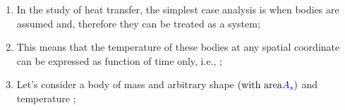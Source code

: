 \documentclass[10pt,compress,unknownkeysallowed]{beamer}
\begin{document}
\begin{frame}
%
        \begin{enumerate}
           \item<1-> In the study of heat transfer, the simplest case analysis is when bodies are assumed  and, therefore they can be treated as a  system;
           \item<2-> This means that the temperature of these bodies at any spatial coordinate can be expressed as function of time only, i.e., ; 
           \item<4-> Let's consider a body of mass  and arbitrary shape $\left(\text{with area} \textcolor{blue}{A_{s}}\right)$ and temperature ;
        \end{enumerate}
\end{frame}

\end{document}
